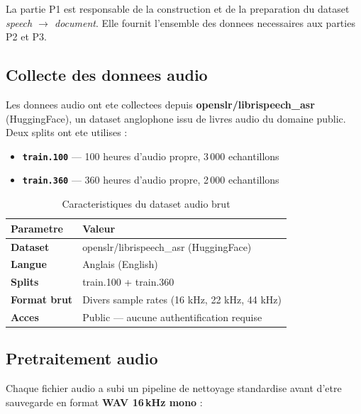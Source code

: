\documentclass[12pt, a4paper]{article}
\begin{document}
La partie P1 est responsable de la construction et de la preparation du dataset
\textit{speech $\rightarrow$ document}. Elle fournit l'ensemble des donnees necessaires
aux parties P2 et P3.

\subsection{Collecte des donnees audio}

Les donnees audio ont ete collectees depuis \textbf{openslr/librispeech\_asr}
(HuggingFace), un dataset anglophone issu de livres audio du domaine public.
Deux splits ont ete utilises :

\begin{itemize}[leftmargin=1.5cm]
  \item \textbf{\texttt{train.100}} --- 100 heures d'audio propre, 3\,000 echantillons
  \item \textbf{\texttt{train.360}} --- 360 heures d'audio propre, 2\,000 echantillons
\end{itemize}

\begin{table}[H]
\centering
\caption{Caracteristiques du dataset audio brut}
\begin{tabularx}{\linewidth}{>{\bfseries\color{blue}}l X}
\toprule
Parametre & Valeur \\
\midrule
Dataset        & openslr/librispeech\_asr (HuggingFace) \\
\rowcolor{silver}
Langue         & Anglais (English) \\
Splits         & train.100 + train.360 \\
\rowcolor{silver}
Format brut    & Divers sample rates (16 kHz, 22 kHz, 44 kHz) \\
Acces          & Public --- aucune authentification requise \\
\bottomrule
\end{tabularx}
\end{table}

\subsection{Pretraitement audio}

Chaque fichier audio a subi un pipeline de nettoyage standardise avant d'etre
sauvegarde en format \textbf{WAV 16\,kHz mono} :
\end{document}
